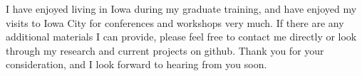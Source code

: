 \documentclass[11pt,letterpaper,sans,unicode]{moderncv}        %
\begin{document}




I have enjoyed living in Iowa during my graduate training, and have enjoyed my visits to Iowa City for conferences and workshops very much. If there are any additional materials I can provide, please feel free to contact me directly or look through my research and current projects on github. Thank you for your consideration, and I look forward to hearing from you soon.  

\vspace{1cm}
\makeletterclosing

\end{document}
